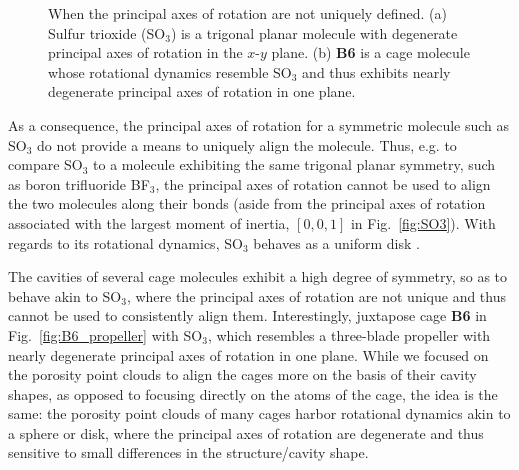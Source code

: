 \documentclass[journal=jacsat,manuscript=article]{achemso}
\begin{document}
{\begin{figure}
\centering
	\caption{{\color{red} When the principal axes of rotation are not uniquely defined. (a) Sulfur trioxide (SO$_3$) is a trigonal planar molecule with degenerate principal axes of rotation in the $x$-$y$ plane. (b) \textbf{B6} is a cage molecule whose rotational dynamics resemble SO$_3$ and thus exhibits nearly degenerate principal axes of rotation in one plane.
	}%
	} \label{fig:irrationallyaligned}
\end{figure}

As a consequence, the principal axes of rotation for a symmetric molecule such as SO$_3$ do not provide a means to uniquely align the molecule. Thus, e.g. to compare SO$_3$ to a molecule exhibiting the same trigonal planar symmetry, such as boron trifluoride BF$_3$, the principal axes of rotation cannot be used to align the two molecules along their bonds (aside from the principal axes of rotation associated with the largest moment of inertia, $[0, 0, 1]$ in Fig.~\ref{fig:SO3}). With regards to its rotational dynamics, SO$_3$ behaves as a uniform disk \cite{peraire2008lecture}.

The cavities of several cage molecules exhibit a high degree of symmetry, so as to behave akin to SO$_3$, where the principal axes of rotation are not unique and thus cannot be used to consistently align them. Interestingly, juxtapose cage \textbf{B6} in Fig.~\ref{fig:B6_propeller} with SO$_3$, which resembles a three-blade propeller \cite{peraire2008lecture} with nearly degenerate principal axes of rotation in one plane. While we focused on the porosity point clouds to align the cages more on the basis of their cavity shapes, as opposed to focusing directly on the atoms of the cage, the idea is the same: the porosity point clouds of many cages harbor rotational dynamics akin to a sphere or disk, where the principal axes of rotation are degenerate and thus sensitive to small differences in the structure/cavity shape. 

}
\end{document}
